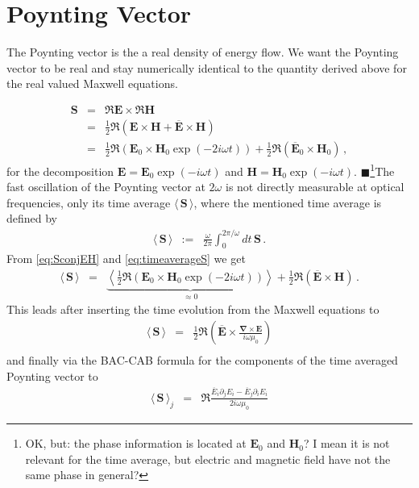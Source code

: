 \documentclass[12pt,a4paper,twoside,openright,BCOR10mm,headsepline,titlepage,abstracton,chapterprefix,final]{scrreprt}
\newcommand\Vector[1]{{\mathbf{#1}}}
\newcommand\vacuum{0}
\newcommand\Nabla{\Vector{\nabla}}
\newcommand\scalarEfield{E}
\newcommand\scalarHfield{H}
\newcommand\Efield{\Vector{\scalarEfield}}
\newcommand\Hfield{\Vector{\scalarHfield}}
\newcommand\vacuumpermeability{\mu_{\vacuum}}
\newcommand{\timeavg}[1]{{\langle\,#1\,\rangle}}
\newcommand{\remark}[1]{{\color{red}$\blacksquare$}\footnote{{\color{red}#1}}}
\newcommand{\chk}[1]{\color{green}{$\checkmark$#1}}
\begin{document}
\section{Poynting Vector\chk{JH}}
The Poynting vector is the a real density of energy flow. 
We want the Poynting vector to be real and stay numerically identical to the quantity derived above for the real valued Maxwell equations.

\begin{eqnarray}
 \Vector{S} &=& \Re \Efield \times \Re \Hfield \nonumber \\
            &=& \frac{1}{2} \Re ( \Efield \times \Hfield + \overline{\Efield} \times \Hfield ) \nonumber \\
            &=& \frac{1}{2} \Re ( \Efield_0 \times \Hfield_0 \exp(-2i\omega t) )
	      + \frac{1}{2} \Re ( \overline{\Efield}_0 \times \Hfield_0 ) \label{eq:SconjEH}\,,
\end{eqnarray}
for the decomposition $\Efield = \Efield_0 \exp(-i\omega t)$ and $\Hfield = \Hfield_0 \exp(-i\omega t)$.
\remark{OK, but: the phase information is located at $\Efield_0$ and $\Hfield_0$? I mean it is not relevant for the time average, but electric and magnetic field have
not the same phase in general?}The fast oscillation of the Poynting vector at $2 \omega$ is not directly measurable at optical frequencies, only its time average $\timeavg{\Vector{S}}$,
where the mentioned time average is defined by
\begin{eqnarray}
 \timeavg{\Vector{S}}  &:=& \frac{\omega}{2\pi} \int_{0}^{2\pi / \omega} dt \, \Vector{S} \label{eq:timeaverageS}\,.
\end{eqnarray}
From \eqref{eq:SconjEH} and \eqref{eq:timeaverageS} we get
\begin{eqnarray}
  \timeavg{\Vector{S}}   &=& \underbrace{\left\langle \frac{1}{2} \Re ( \Efield_0 \times \Hfield_0 \exp(-2i\omega t) )\right\rangle}_{\approx0} + \frac{1}{2} \Re ( \overline{\Efield} \times \Hfield )\,.
\end{eqnarray}
This leads after inserting the time evolution from the Maxwell equations to
\begin{eqnarray}
 \timeavg{\Vector{S}}   &=& \frac{1}{2} \Re \left( \overline{\Efield} \times \frac{\Nabla \times \Efield}{i \omega \vacuumpermeability} \right) \\
\end{eqnarray}
and finally via the BAC-CAB formula for the components of the time averaged Poynting vector to
\begin{eqnarray}
  \timeavg{\Vector{S}}_j &=&  \Re \frac{ \overline{\scalarEfield}_i \partial_j \scalarEfield_i - \overline{\scalarEfield}_j \partial_i \scalarEfield_i }{2 i \omega \vacuumpermeability}
\end{eqnarray}
\end{document}
